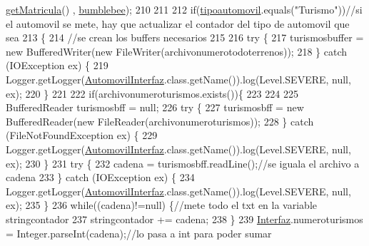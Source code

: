 \begin{DoxyCode}
      \mbox{\hyperlink{classejercicio2_1_1_vehiculo_a5dd89b85bb4c8a9da01224fea2b754f0}{getMatricula}}() , \mbox{\hyperlink{classejercicio2_1_1_automovil_interfaz_a3ef1155acaf49db6e36883797090f677}{bumblebee}});
210             
211             
212         \textcolor{keywordflow}{if}(\mbox{\hyperlink{classejercicio2_1_1_automovil_interfaz_ae53ea3336ded07ff47311d4e6d56cdb7}{tipoautomovil}}.equals(\textcolor{stringliteral}{"Turismo"}))\textcolor{comment}{//si el automovil se mete, hay que actualizar el
       contador del tipo de automovil que sea}
213         \{
214             \textcolor{comment}{//se crean los buffers necesarios}
215             
216                 \textcolor{keywordflow}{try} \{
217                     turismosbuffer = \textcolor{keyword}{new} BufferedWriter(\textcolor{keyword}{new} FileWriter(archivonumerotodoterrenos));
218                 \} \textcolor{keywordflow}{catch} (IOException ex) \{
219                     Logger.getLogger(\mbox{\hyperlink{classejercicio2_1_1_automovil_interfaz_a0ebeee030ec43693c371da3b68222644}{AutomovilInterfaz}}.class.getName()).log(Level.SEVERE, 
      null, ex);
220                 \}
221             
222             \textcolor{keywordflow}{if}(archivonumeroturismos.exists())\{
223             
224                 
225                 BufferedReader turismosbff = null;
226                 \textcolor{keywordflow}{try} \{
227                     turismosbff = \textcolor{keyword}{new} BufferedReader(\textcolor{keyword}{new} FileReader(archivonumeroturismos));
228                 \} \textcolor{keywordflow}{catch} (FileNotFoundException ex) \{
229                     Logger.getLogger(\mbox{\hyperlink{classejercicio2_1_1_automovil_interfaz_a0ebeee030ec43693c371da3b68222644}{AutomovilInterfaz}}.class.getName()).log(Level.SEVERE, 
      null, ex);
230                 \}
231                 \textcolor{keywordflow}{try} \{
232                     cadena = turismosbff.readLine();\textcolor{comment}{//se iguala el archivo a cadena}
233                 \} \textcolor{keywordflow}{catch} (IOException ex) \{
234                     Logger.getLogger(\mbox{\hyperlink{classejercicio2_1_1_automovil_interfaz_a0ebeee030ec43693c371da3b68222644}{AutomovilInterfaz}}.class.getName()).log(Level.SEVERE, 
      null, ex);
235                 \}
236                 \textcolor{keywordflow}{while}((cadena)!=null) \{\textcolor{comment}{//mete todo el txt en la variable stringcontador}
237                         stringcontador += cadena;
238                     \}
239                 \mbox{\hyperlink{namespace_interfaz}{Interfaz}}.numeroturismos = Integer.parseInt(cadena);\textcolor{comment}{//lo pasa a int para poder sumar
}
\end{DoxyCode}
